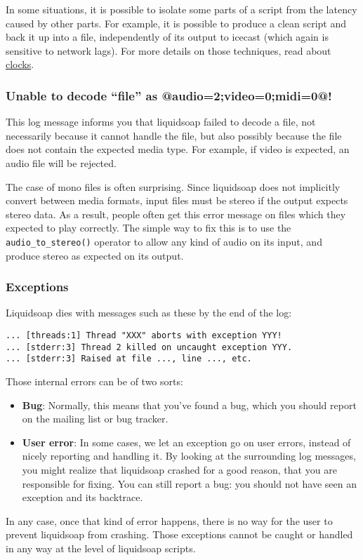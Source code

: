 \documentclass{book}
\begin{document}
In some situations, it is possible to isolate some parts of a script from the
latency caused by other parts. For example, it is possible to produce a clean
script and back it up into a file, independently of its output to icecast (which
again is sensitive to network lags).  For more details on those techniques, read
about \href{clocks.html}{clocks}.

\subsubsection{Unable to decode ``file'' as @{audio=2;video=0;midi=0}@!}
This log message informs you that liquidsoap failed to decode a file, not
necessarily because it cannot handle the file, but also possibly because the
file does not contain the expected media type. For example, if video is
expected, an audio file will be rejected.

The case of mono files is often surprising. Since liquidsoap does not implicitly
convert between media formats, input files must be stereo if the output expects
stereo data. As a result, people often get this error message on files which
they expected to play correctly. The simple way to fix this is to use the
\verb+audio_to_stereo()+ operator to allow any kind of audio on its input, and
produce stereo as expected on its output.

\subsubsection{Exceptions}
Liquidsoap dies with messages such as these by the end of the log:

\begin{verbatim}
... [threads:1] Thread "XXX" aborts with exception YYY!
... [stderr:3] Thread 2 killed on uncaught exception YYY.
... [stderr:3] Raised at file ..., line ..., etc.
\end{verbatim}
Those internal errors can be of two sorts:

\begin{itemize}
\item \textbf{Bug}: Normally, this means that you've found a bug, which you
  should report on the mailing list or bug tracker.
\item \textbf{User error}: In some cases, we let an exception go on user errors,
  instead of nicely reporting and handling it. By looking at the surrounding log
  messages, you might realize that liquidsoap crashed for a good reason, that
  you are responsible for fixing. You can still report a bug: you should not
  have seen an exception and its backtrace.

\end{itemize}
In any case, once that kind of error happens, there is no way for the user to
prevent liquidsoap from crashing. Those exceptions cannot be caught or handled
in any way at the level of liquidsoap scripts.
\end{document}
